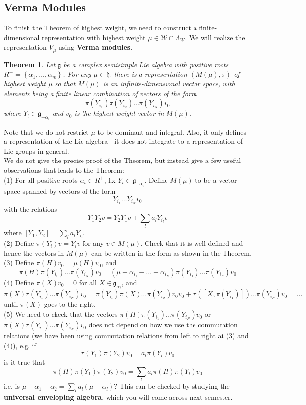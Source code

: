 \documentclass[11pt]{article}
\newtheorem{theorem}{Theorem}[section]
\newcommand{\mc}[1]{\mathcal{#1}}
\newcommand{\mf}[1]{\mathfrak{#1}}
\begin{document}
\subsection{Verma Modules}
To finish the Theorem of highest weight, we need to construct a finite-dimensional representation with highest weight $\mu \in \mc{W} \cap \Lambda_W$. We will realize the representation $V_{\mu}$ using \textbf{Verma modules}.
\begin{theorem}
Let $\mf{g}$ be a complex semisimple Lie algebra with positive roots $R^+ = \left\{\alpha_1, \dots, \alpha_m\right\}$. For any $\mu \in \mf{h}$, there is a representation $(M(\mu), \pi)$ of highest weight $\mu$ so that $M(\mu)$ is an infinite-dimensional vector space, with elements being a finite linear combination of vectors of the form
$$\pi(Y_{i_1})\pi(Y_{i_2})\dots \pi(Y_{i_N})v_0$$
where $Y_{i} \in \mf{g}_{-\alpha_i}$ and $v_0$ is the highest weight vector in $M(\mu)$.
\end{theorem}
\noindent Note that we do not restrict $\mu$ to be dominant and integral. Also, it only defines a representation of the Lie algebra - it does not integrate to a representation of Lie groups in general.\\
We do not give the precise proof of the Theorem, but instead give a few useful observations that leads to the Theorem:\\
(1) For all positive roots $\alpha_i \in R^+$, fix $Y_i \in \mf{g}_{-\alpha_i}$. Define $M(\mu)$ to be a vector space spanned by vectors of the form
$$Y_{i_1}\dots Y_{i_N}v_0$$
with the relations
$$Y_1Y_2v = Y_2Y_1v + \sum_l a_l Y_{i_l}v$$
where $[Y_1, Y_2] = \sum_l a_l Y_{i_l}$.\\
(2) Define $\pi(Y_i)v = Y_iv$ for any $v \in M(\mu)$. Check that it is well-defined and hence the vectors in $M(\mu)$ can be written in the form as shown in the Theorem.\\
(3) Define $\pi(H)v_0 = \mu(H)v_0$, and
$$\pi(H) \pi(Y_{i_1})\dots \pi(Y_{i_N})v_0 = (\mu - \alpha_{i_1} - \dots - \alpha_{i_N})\pi(Y_{i_1})\dots \pi(Y_{i_N})v_0 $$
(4) Define $\pi(X)v_0 = 0$ for all $X \in \mf{g}_{\alpha_i}$, and
$$\pi(X) \pi(Y_{i_1})\dots \pi(Y_{i_N})v_0 = \pi(Y_{i_1})\pi(X)\dots \pi(Y_{i_N})v_0v_0 + \pi([X,\pi(Y_{i_1})]) \dots \pi(Y_{i_N})v_0 = \dots$$
until $\pi(X)$ goes to the right.\\
(5) We need to check that the vectors $\pi(H) \pi(Y_{i_1})\dots \pi(Y_{i_N})v_0$ or $\pi(X) \pi(Y_{i_1})\dots \pi(Y_{i_N})v_0$ does not depend on how we use the commutation relations (we have been using commutation relations from left to right at (3) and (4)), e.g. if
$$\pi(Y_1)\pi(Y_2)v_0 = a_l \pi(Y_l)v_0$$
is it true that
$$\pi(H)\pi(Y_1)\pi(Y_2)v_0 = \sum_l a_l \pi(H)\pi(Y_l)v_0$$
i.e. is $\mu-\alpha_1 - \alpha_2 = \sum_l a_l (\mu - \alpha_l)$?
This can be checked by studying the \textbf{universal enveloping algebra}, which you will come across next semester.\\
\end{document}
